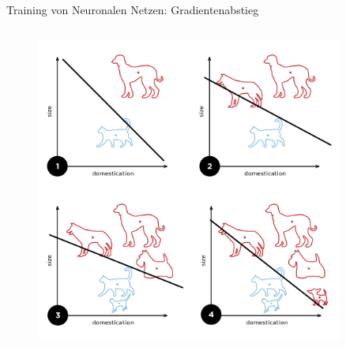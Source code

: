 \documentclass[aspectratio=1610, xcolor=dvipsnames, 9pt]{beamer}
\begin{document}
\begin{frame}{Training von Neuronalen Netzen: Gradientenabstieg}
\begin{columns}
\begin{column}{0.3\textwidth}
\begin{figure}
       \centering
                   \includegraphics[width=0.9\textwidth]{images/Perceptron_example.svg.png}
       \end{figure}
          \end{column}
        \end{columns}
      \end{frame}
\end{document}
